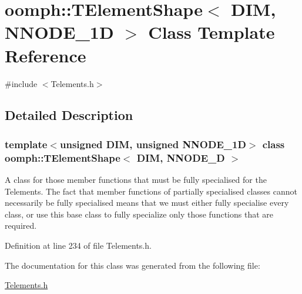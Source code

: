 \hypertarget{classoomph_1_1TElementShape}{}\section{oomph\+:\+:T\+Element\+Shape$<$ D\+IM, N\+N\+O\+D\+E\+\_\+1D $>$ Class Template Reference}
\label{classoomph_1_1TElementShape}


{\ttfamily \#include $<$Telements.\+h$>$}



\subsection{Detailed Description}
\subsubsection*{template$<$unsigned D\+IM, unsigned N\+N\+O\+D\+E\+\_\+1D$>$\newline
class oomph\+::\+T\+Element\+Shape$<$ D\+I\+M, N\+N\+O\+D\+E\+\_\+D $>$}

A class for those member functions that must be fully specialised for the Telements. The fact that member functions of partially specialised classes cannot necessarily be fully specialised means that we must either fully specialise every class, or use this base class to fully specialize only those functions that are required. 

Definition at line 234 of file Telements.\+h.



The documentation for this class was generated from the following file\+:\begin{DoxyCompactItemize}
\item 
\hyperlink{Telements_8h}{Telements.\+h}\end{DoxyCompactItemize}
